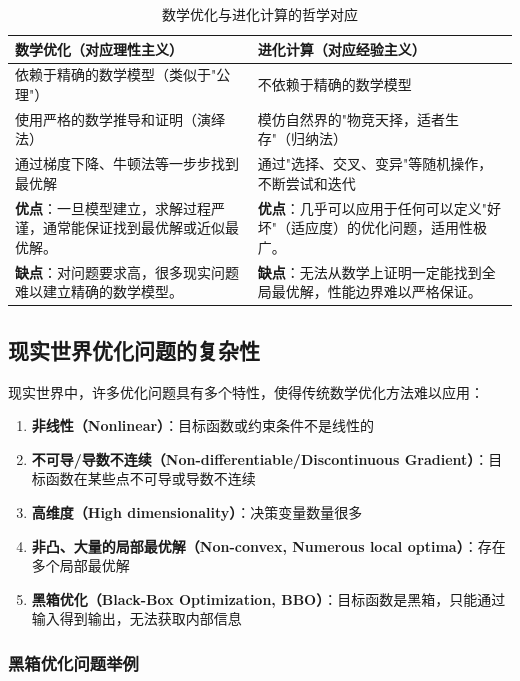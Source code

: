 \begin{table}[H]
\centering
\caption{数学优化与进化计算的哲学对应}
\begin{tabular}{p{}p{}}
\toprule
\textbf{数学优化（对应理性主义）} & \textbf{进化计算（对应经验主义）} \\
\midrule
依赖于精确的数学模型（类似于"公理"） & 不依赖于精确的数学模型 \\
\hline
使用严格的数学推导和证明（演绎法） & 模仿自然界的"物竞天择，适者生存"（归纳法） \\
\hline
通过梯度下降、牛顿法等一步步找到最优解 & 通过"选择、交叉、变异"等随机操作，不断尝试和迭代 \\
\hline
\textbf{优点}：一旦模型建立，求解过程严谨，通常能保证找到最优解或近似最优解。 & \textbf{优点}：几乎可以应用于任何可以定义"好坏"（适应度）的优化问题，适用性极广。 \\
\hline
\textbf{缺点}：对问题要求高，很多现实问题难以建立精确的数学模型。 & \textbf{缺点}：无法从数学上证明一定能找到全局最优解，性能边界难以严格保证。 \\
\bottomrule
\end{tabular}
\end{table}

\subsection{现实世界优化问题的复杂性}

现实世界中，许多优化问题具有多个特性，使得传统数学优化方法难以应用：

\begin{enumerate}
    \item \textbf{非线性（Nonlinear）}：目标函数或约束条件不是线性的
    \item \textbf{不可导/导数不连续（Non-differentiable/Discontinuous Gradient）}：目标函数在某些点不可导或导数不连续
    \item \textbf{高维度（High dimensionality）}：决策变量数量很多
    \item \textbf{非凸、大量的局部最优解（Non-convex, Numerous local optima）}：存在多个局部最优解
    \item \textbf{黑箱优化（Black-Box Optimization, BBO）}：目标函数是黑箱，只能通过输入得到输出，无法获取内部信息
\end{enumerate}

\subsubsection{黑箱优化问题举例}

